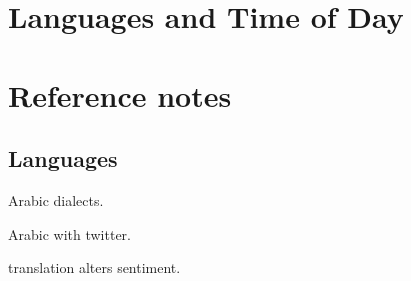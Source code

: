 \documentclass[sigconf,10pt]{acmart}
\begin{document}
\onecolumn
\section{Languages and Time of Day}
\noindent

\noindent

\noindent

\noindent

\noindent

\noindent

\noindent

\noindent

\noindent

\noindent

\noindent

\noindent

\noindent

\noindent

\noindent

\noindent

\noindent

\noindent

\noindent

\noindent

\noindent


\newpage
\section{Reference notes}


\subsection{Languages}

\citet{zaidan2014arabic} Arabic dialects.

\citet{refaee2014arabic} Arabic with twitter.

\citet{mohammad2016translation} translation alters sentiment.

\end{document}
